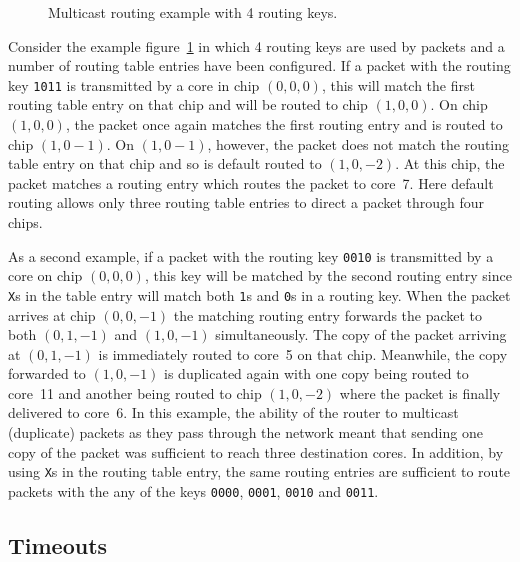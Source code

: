 			\begin{figure}
				\center
				
				\caption{Multicast routing example with \SI{4}{\bit} routing keys.}
				\label{fig:routing-example}
			\end{figure}
			
			Consider the example figure~\ref{fig:routing-example} in which
			\SI{4}{\bit} routing keys are used by packets and a number of routing
			table entries have been configured. If a packet with the routing key
			\texttt{1011} is transmitted by a core in chip $(0, 0, 0)$, this will
			match the first routing table entry on that chip and will be routed to
			chip $(1, 0, 0)$. On chip $(1, 0, 0)$, the packet once again matches the
			first routing entry and is routed to chip $(1, 0 -1)$. On $(1, 0 -1)$,
			however, the packet does not match the routing table entry on that chip
			and so is default routed to $(1, 0, -2)$. At this chip, the packet
			matches a routing entry which routes the packet to core~7. Here default
			routing allows only three routing table entries to direct a packet
			through four chips.
			
			As a second example, if a packet with the routing key \texttt{0010} is
			transmitted by a core on chip $(0, 0, 0)$, this key will be matched by
			the second routing entry since \texttt{X}s in the table entry will match
			both \texttt{1}s and \texttt{0}s in a routing key. When the packet
			arrives at chip $(0, 0, -1)$ the matching routing entry forwards the
			packet to both $(0, 1, -1)$ and $(1, 0, -1)$ simultaneously. The copy of
			the packet arriving at $(0, 1, -1)$ is immediately routed to core~5 on
			that chip.  Meanwhile, the copy forwarded to $(1, 0, -1)$ is duplicated
			again with one copy being routed to core~11 and another being routed to
			chip $(1, 0, -2)$ where the packet is finally delivered to core~6. In
			this example, the ability of the router to multicast (duplicate) packets
			as they pass through the network meant that sending one copy of the
			packet was sufficient to reach three destination cores. In addition, by
			using \texttt{X}s in the routing table entry, the same routing entries
			are sufficient to route packets with the any of the keys \texttt{0000},
			\texttt{0001}, \texttt{0010} and \texttt{0011}.
		
		\subsection{Timeouts}
			
